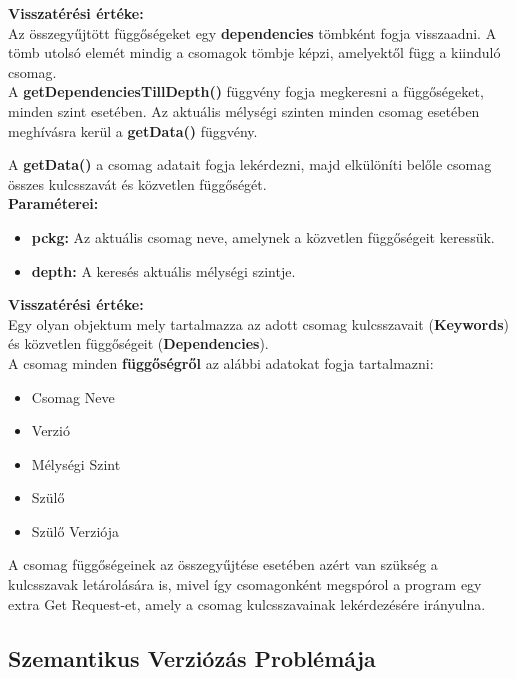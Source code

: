 \noindent \textbf{Visszatérési értéke:} \\

Az összegyűjtött függőségeket egy \textbf{dependencies} tömbként fogja visszaadni. A tömb utolsó elemét mindig a csomagok tömbje képzi, amelyektől függ a kiinduló csomag.\\

A \textbf{getDependenciesTillDepth()} függvény fogja megkeresni a függőségeket, minden szint esetében. Az aktuális mélységi szinten minden csomag esetében meghívásra kerül a \textbf{getData()} függvény.
\pagebreak

A \textbf{getData()} a csomag adatait fogja lekérdezni, majd elkülöníti belőle csomag összes kulcsszavát és közvetlen függőségét.\\ 

\noindent \textbf{Paraméterei:}

\begin{itemize}
	\item \textbf{pckg: }Az aktuális csomag neve, amelynek a közvetlen függőségeit keressük.
	\item \textbf{depth: }A keresés aktuális mélységi szintje.
\end{itemize}

\noindent \textbf{Visszatérési értéke:} \\

Egy olyan objektum mely tartalmazza az adott csomag kulcsszavait (\textbf{Keywords}) és közvetlen függőségeit (\textbf{Dependencies}).\\

\noindent A csomag minden \textbf{függőségről} az alábbi adatokat fogja tartalmazni:
\begin{itemize}
	\item Csomag Neve
	\item Verzió
	\item Mélységi Szint
	\item Szülő
	\item Szülő Verziója
\end{itemize}

A csomag függőségeinek az összegyűjtése esetében azért van szükség a kulcsszavak letárolására is, mivel így csomagonként megspórol a program egy extra Get Request-et, amely a csomag kulcsszavainak lekérdezésére irányulna.

\subsection{Szemantikus Verziózás Problémája}

